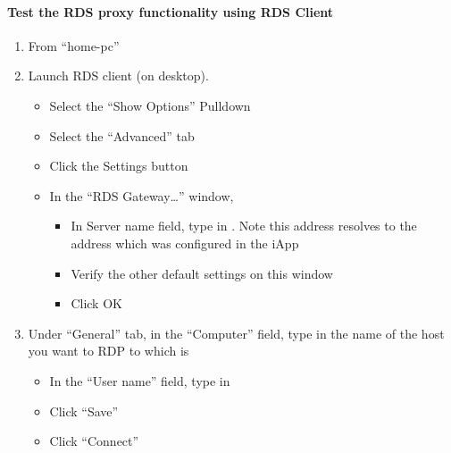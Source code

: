 \documentclass[letterpaper,10pt,english]{sphinxmanual}
\begin{document}
\paragraph{Test the RDS proxy functionality using RDS Client}
\label{\detokenize{class2/module3/lab1:test-the-rds-proxy-functionality-using-rds-client}}\begin{enumerate}
\item {} 
From “home-pc”

\item {} 
Launch RDS client (on desktop).
\begin{itemize}
\item {} 
Select the “Show Options” Pulldown

\item {} 
Select the “Advanced” tab

\item {} 
Click the Settings button

\item {} 
In the “RDS Gateway…” window,
\begin{itemize}
\item {} 
In Server name field, type in .
Note this address resolves to the address  which
was configured in the iApp


\item {} 
Verify the other default settings on this window

\item {} 
Click OK

\end{itemize}

\end{itemize}

\item {} 
Under “General” tab, in the “Computer” field, type in the name of the
host you want to RDP to which is 
\begin{itemize}
\item {} 
In the “User name” field, type in 


\item {} 
Click “Save”

\item {} 
Click “Connect”


\end{itemize}
\end{enumerate}
\end{document}
